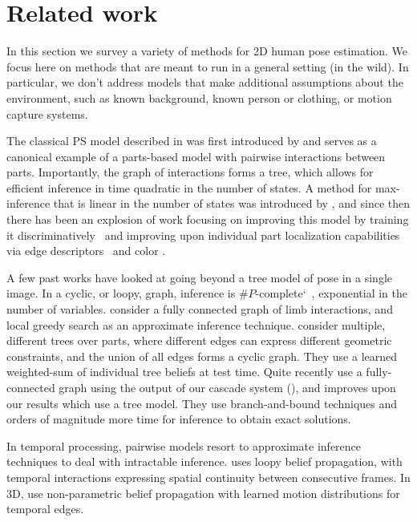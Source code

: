 \chapter{Related work}

In this section we survey a variety of methods for 2D human pose estimation.  
We focus here on methods that are meant to run in a general setting (\ie in the 
wild).  In particular, we don't address models that make additional assumptions 
about the environment, such as known background, known person or clothing, or 
motion capture systems.


 The classical PS model described in  was first 
introduced by \citet{fischler1973ps} and serves as a canonical example of a 
parts-based model with pairwise interactions between parts.  Importantly, the 
graph of interactions forms a tree, which allows for efficient inference in 
time quadratic in the number of states.  A method for max-inference that is 
linear in the number of states was introduced by \citet{felz05}, and since then 
there has been an explosion of work focusing on improving this model by 
training it discriminatively~\citep{devacrf,andriluka09} and improving upon 
individual part localization capabilities via edge 
descriptors~\citep{andriluka09} and color \citep{eichner09}.

A few past works have looked at going beyond a tree model of pose in a single 
image.  In a cyclic, or loopy, graph, inference is 
$\#P$-complete`~\citep{koller-book}, exponential in the number of variables.  
\citet{ddtran} consider a fully connected graph of limb interactions, and local 
greedy search as an approximate inference technique. \citet{wang2008multiple} 
consider multiple, different trees over parts, where different edges can 
express different geometric constraints, and the union of all edges forms a 
cyclic graph.  They use a learned weighted-sum of individual tree beliefs at 
test time.  Quite recently \citet{min-bb} use a fully-connected graph using the 
output of our cascade system (), and improves upon our results 
which use a tree model.  They use branch-and-bound techniques and orders of 
magnitude more time for inference to obtain exact solutions.

In temporal processing, pairwise models resort to approximate inference 
techniques to deal with intractable inference.  \citet{ferrari08} uses loopy 
belief propagation, with temporal interactions expressing spatial continuity 
between consecutive frames.  In 3D, \citet{sigal2004tracking} use 
non-parametric belief propagation with learned motion distributions for 
temporal edges.

